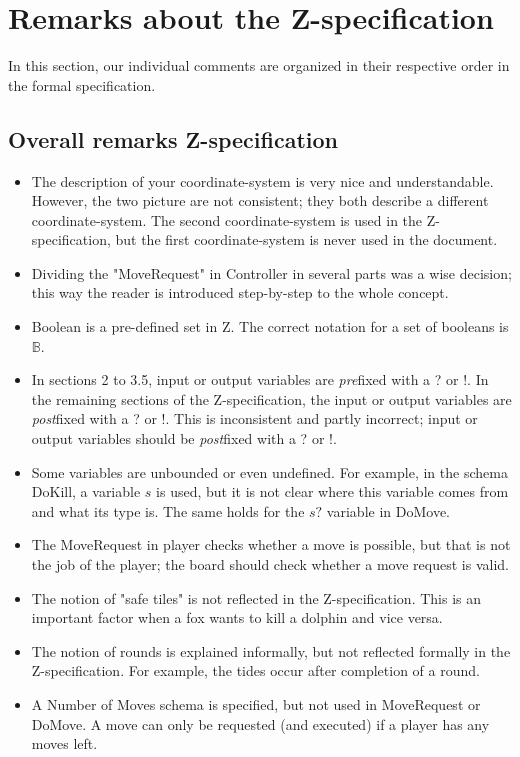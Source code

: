 \documentclass[a4paper,11pt]{article}
\begin{document}
	\section{Remarks about the Z-specification}
    In this section, our individual comments are organized in their respective order in the formal specification.
    \subsection{Overall remarks Z-specification}
    \begin{itemize}
        \item The description of your coordinate-system is very nice and understandable. However, the two picture are not consistent; they both describe a different coordinate-system. The second coordinate-system is used in the Z-specification, but the first coordinate-system is never used in the document.      
        \item Dividing the "MoveRequest" in Controller in several parts was a wise decision; this way the reader is introduced step-by-step to the whole concept.
        \item Boolean is a pre-defined set in Z. The correct notation for a set of booleans is $\mathds{B}$.
        \item In sections 2 to  3.5, input or output variables are \emph{pre}fixed with a ? or !. In the remaining sections of the Z-specification, the input or output variables are \emph{post}fixed with a ? or !. This is inconsistent and partly incorrect; input or output variables should be \emph{post}fixed with a ? or !.
        \item Some variables are unbounded or even undefined. For example, in the schema DoKill, a variable $s$ is used, but it is not clear where this variable comes from and what its type is. The same holds for the $s?$ variable in DoMove.
        \item The MoveRequest in player checks whether a move is possible, but that is not the job of the player; the board should check whether a move request is valid.
        \item The notion of "safe tiles" is not reflected in the Z-specification. This is an important factor when a fox wants to kill a dolphin and vice versa.
        \item The notion of rounds is explained informally, but not reflected formally in the Z-specification. For example, the tides occur after completion of a round.
        \item A Number of Moves schema is specified, but not used in MoveRequest or DoMove. A move can only be requested (and executed) if a player has any moves left.

\end{itemize}
\end{document}
